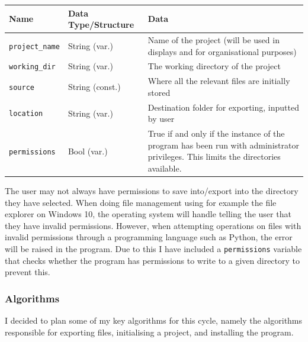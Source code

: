 \documentclass[11pt]{article}
\begin{document}
            \begin{table}[!ht]
            \begin{center}
                \begin{tabular}{llm{}}
                Name & Data Type/Structure & Data \\ \hline
                \verb|project_name| & String (var.) & Name of the project (will be used in displays and for organisational purposes) \\
                \verb|working_dir| & String (var.) & The working directory of the project \\
                \verb|source| & String (const.) & Where all the relevant files are initially stored \\
                \verb|location| & String (var.) & Destination folder for exporting, inputted by user \\
                \verb|permissions| & Bool (var.) & True if and only if the instance of the program has been run with administrator privileges. This limits the directories available.
                \end{tabular}
            \end{center}
            \end{table}

            The user may not always have permissions to save into/export into the directory they have selected. When doing file management using for example the file explorer on Windows 10, the operating system will handle telling the user that they have invalid permissions. However, when attempting operations on files with invalid permissions through a programming language such as Python, the error will be raised in the program. Due to this I have included a \verb|permissions| variable that checks whether the program has permissions to write to a given directory to prevent this.

            \pagebreak
        \subsubsection{Algorithms}
            I decided to plan some of my key algorithms for this cycle, namely the algorithms responsible for exporting files, initialising a project, and installing the program. 
            
\end{document}
